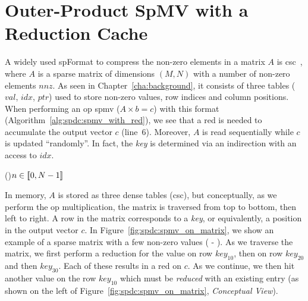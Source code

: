 
\section{Outer-Product SpMV with a Reduction Cache}
\label{sec:spdc:opspmvonredc}

\lettrine{A}{} widely used \gls{spFormat} to compress the non-zero elements in a matrix $A$ is \acrshort{csc}~\cite{Saad2003_COO_CSR_DIA_ELL}, where $A$ is a sparse matrix of dimensions $(M, N)$ with a number of non-zero elements $\mathit{nnz}$.
As seen in Chapter~\ref{cha:background}, it consists of three tables ($\mathit{val}$, $\mathit{idx}$, $\mathit{ptr}$) used to store non-zero values, row indices and column positions.
When performing an \acrshort{op} \acrshort{spmv} ($A \times b = c$) with this format (Algorithm~\ref{alg:spdc:spmv_with_red}), we see that a \acrshort{red} is needed to accumulate the output vector $c$ (line~6).
Moreover, $A$ is read sequentially while $c$ is updated ``randomly''.
In fact, the \emph{key} is determined via an indirection with an access to $\mathit{idx}$.

\begin{algorithm}[htb]
    \caption{\acrlong{op} \acrshort{spmv} -- Single Threaded}
    \label{alg:spdc:spmv_with_red}
    \For(){$n \in [\![ 0, N-1 ]\!]$}{
    }
\end{algorithm}

In memory, $A$ is stored as three dense tables (\acrshort{csc}), but conceptually, as we perform the \acrshort{op} multiplication, the matrix is traversed from top to bottom, then left to right.
A row in the matrix corresponds to a \emph{key}, or equivalently, a position in the output vector $c$.
In Figure~\ref{fig:spdc:spmv_on_matrix}, we show an example of a sparse matrix with a few non-zero values ( - ).
As we traverse the matrix, we first perform a \gls{reduction} for the value on row $\mathit{key}_{10}$, then on row $\mathit{key}_{20}$ and then $\mathit{key}_{30}$.
Each of these results in a \acrshort{red} on $c$.
As we continue, we then \gls{hit} another value  on the row $\mathit{key}_{10}$ which must be \emph{reduced} with an existing entry 
 (as shown on the left of Figure~\ref{fig:spdc:spmv_on_matrix}, \emph{Conceptual View}).


